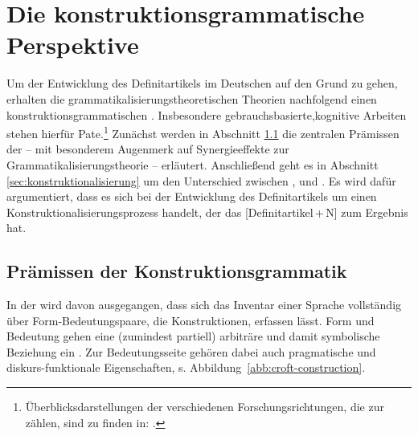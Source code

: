 \section{Die konstruktionsgrammatische Perspektive}\label{sec:kxg}
Um der Entwicklung des Definitartikels im Deutschen auf den Grund zu gehen, erhalten die grammatikalisierungstheoretischen Theorien nachfolgend einen konstruktionsgrammatischen . Insbesondere gebrauchsbasierte,\linebreak kognitive  Arbeiten \parencite[u.a.][]{Langacker1987,Goldberg1995,Goldberg2006,Croft2002,Croft2004,Bybee2006,Bybee2010} stehen hierfür Pate.\footnote{Überblicksdarstellungen der verschiedenen Forschungsrichtungen, die zur  zählen, sind zu finden in:   \textcite{Croft2004,Imo2007,Stefanowitsch2011,Hoffmann2013,Ziem2013}.} Zunächst werden in Abschnitt \ref{sec:kxg-grundlagen} die zentralen Prämissen der  -- mit besonderem Augenmerk auf Synergieeffekte zur  Grammatikalisierungstheorie -- erläutert. Anschließend geht es in Abschnitt \ref{sec:konstruktionalisierung} um den Unterschied zwischen ,   und . Es wird dafür argumentiert, dass es sich bei der Entwicklung des Definitartikels  um einen Konstruktionalisierungsprozess  handelt, der das   [Definitartikel\,+\,N] zum Ergebnis hat.  

\subsection{Prämissen der Konstruktionsgrammatik}\label{sec:kxg-grundlagen}


In der  wird davon ausgegangen, dass sich das Inventar einer Sprache vollständig über Form-Bedeutungspaare, die Konstruktionen, erfassen lässt. Form und Bedeutung gehen eine (zumindest partiell) arbiträre und damit symbolische Beziehung ein \parencite[257]{Croft2004}. Zur Bedeutungsseite gehören dabei auch pragmatische und diskurs-funktionale Eigenschaften, s. Abbildung~\ref{abb:croft-construction}.  

